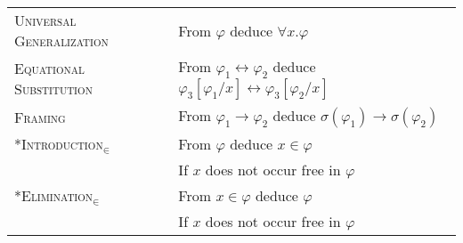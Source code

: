 \documentclass{article}
\newcommand{\imp}{\rightarrow}
\newcommand{\dimp}{\leftrightarrow}
\begin{document}
\begin{longtable}{ll}
     \textsc{Universal Generalization}
  &  From $\varphi$ deduce $\forall x . \varphi$
  \\
     \textsc{Equational Substitution}
  &  From $\varphi_1 \dimp \varphi_2$ deduce $\varphi_3[\varphi_1/x] \dimp 
  \varphi_3[\varphi_2/x]$
  \\
  \textsc{Framing}
  &  From $\varphi_1 \imp \varphi_2$ deduce $\sigma(\varphi_1) \imp 
  \sigma(\varphi_2)$
  \\
     \textsc{*Introduction$_\in$}
  &  From $\varphi$ deduce $x \in \varphi$
  \\
  &
     If $x$ does not occur free in $\varphi$
  \\
     \textsc{*Elimination$_\in$}
  &  From $x \in \varphi$ deduce $\varphi$
  \\
  &
     If $x$ does not occur free in $\varphi$
\end{longtable}
\egroup
\end{document}
